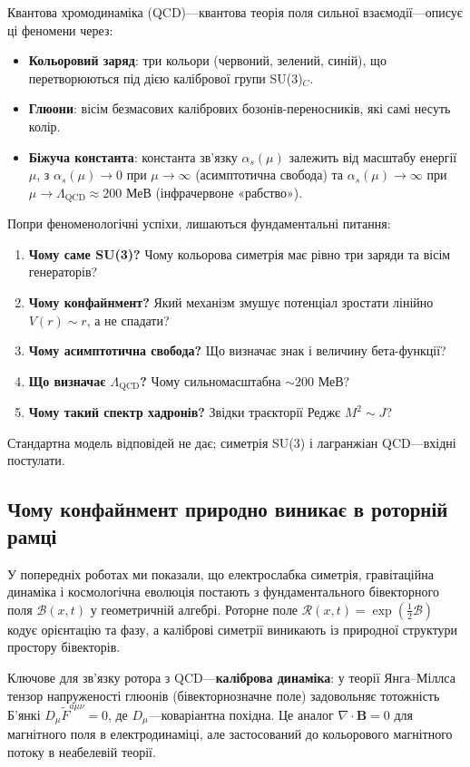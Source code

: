\documentclass[11pt,a4paper]{article}
\newcommand{\Rotor}{\mathcal{R}}
\newcommand{\Biv}{\mathcal{B}}
\theoremstyle{definition}
\theoremstyle{plain}
\theoremstyle{remark}
\begin{document}
Квантова хромодинаміка (QCD)—квантова теорія поля сильної взаємодії—описує ці феномени через:
\begin{itemize}[leftmargin=*,itemsep=3pt]
  \item \textbf{Кольоровий заряд}: три кольори (червоний, зелений, синій), що перетворюються під дією калібрової групи SU(3)$_C$.
  \item \textbf{Глюони}: вісім безмасових калібрових бозонів-переносників, які самі несуть колір.
  \item \textbf{Біжуча константа}: константа зв’язку $\alpha_s(\mu)$ залежить від масштабу енергії $\mu$, з $\alpha_s(\mu)\to 0$ при $\mu\to\infty$ (асимптотична свобода) та $\alpha_s(\mu)\to\infty$ при $\mu\to\Lambda_{\mathrm{QCD}}\approx 200$ МеВ (інфрачервоне «рабство»).
\end{itemize}

Попри феноменологічні успіхи, лишаються фундаментальні питання:
\begin{enumerate}[leftmargin=*,itemsep=3pt]
  \item \textbf{Чому саме SU(3)?} Чому кольорова симетрія має рівно три заряди та вісім генераторів?
  \item \textbf{Чому конфайнмент?} Який механізм змушує потенціал зростати лінійно $V(r)\sim r$, а не спадати?
  \item \textbf{Чому асимптотична свобода?} Що визначає знак і величину бета-функції?
  \item \textbf{Що визначає $\Lambda_{\mathrm{QCD}}$?} Чому сильномасштабна $\sim 200$ МеВ?
  \item \textbf{Чому такий спектр хадронів?} Звідки траєкторії Реджє $M^2\sim J$?
\end{enumerate}

Стандартна модель відповідей не дає; симетрія SU(3) і лагранжіан QCD—вхідні постулати.

\subsection{Чому конфайнмент природно виникає в роторній рамці}

У попередніх роботах ми показали, що електрослабка симетрія, гравітаційна динаміка і космологічна еволюція постають з фундаментального бівекторного поля $\Biv(x,t)$ у геометричній алгебрі. Роторне поле $\Rotor(x,t)=\exp(\frac{1}{2}\Biv)$ кодує орієнтацію та фазу, а каліброві симетрії виникають із природної структури простору бівекторів.

Ключове для зв’язку ротора з QCD—\textbf{каліброва динаміка}: у теорії Янга–Міллса тензор напруженості глюонів (бівекторнозначне поле) задовольняє тотожність Б’янкі $D_\mu \tilde{F}^{a\mu\nu}=0$, де $D_\mu$—коваріантна похідна. Це аналог $\nabla\cdot\mathbf{B}=0$ для магнітного поля в електродинаміці, але застосований до кольорового магнітного потоку в неабелевій теорії.
\end{document}

